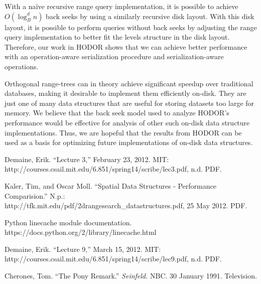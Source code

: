 \documentclass[11pt, oneside]{article}
\begin{document}
With a na{\"i}ve recursive range query implementation, it is possible to achieve
$O(\log_B^d n)$ back seeks by using a similarly recursive disk layout. With this
disk layout, it is possible to perform queries without back seeks by adjusting
the range query implementation to better fit the levels structure in the disk
layout. Therefore, our work in HODOR shows that we can achieve better
performance with an operation-aware serialization procedure and
serialization-aware operations. 

Orthogonal range-trees can in theory achieve significant speedup over
traditional databases, making it desirable to implement them efficiently
on-disk. They are just one of many data structures that are useful for storing
datasets too large for memory. We believe that the back seek model used to
analyze HODOR's performance would be effective for analysis of other such
on-disk data structure implementations. Thus, we are hopeful that the results
from HODOR can be used as a basis for optimizing future implementations of
on-disk data structures. 

\newpage

\begin{thebibliography}{1}
    
     Demaine, Erik. ``Lecture 3,'' February 23, 2012.  MIT: \\
        http://courses.csail.mit.edu/6.851/spring14/scribe/lec3.pdf, n.d. PDF.

     Kaler, Tim, and Oscar Moll. ``Spatial Data Structures -
        Performance Comparision.'' N.p.: \\
        http://tfk.mit.edu/pdf/2drangesearch\_datastructures.pdf, 25 May 2012.
        PDF.

     Python linecache module documentation. \\
        https://docs.python.org/2/library/linecache.html 

     Demaine, Erik. ``Lecture 9,'' March 15, 2012. MIT: \\
        http://courses.csail.mit.edu/6.851/spring14/scribe/lec9.pdf, n.d. PDF.

     Cherones, Tom. ``The Pony Remark.'' \textit{Seinfeld.}
        NBC. 30 January 1991. Television.

\end{thebibliography}
\end{document}
